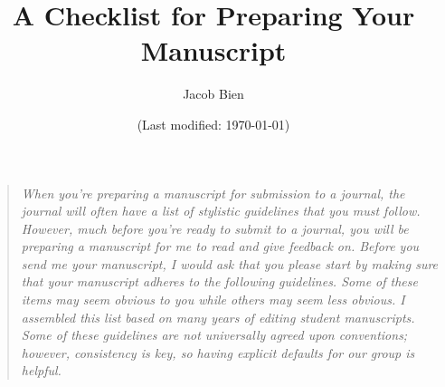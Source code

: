 \documentclass[11pt]{article}
\title{A Checklist for Preparing Your Manuscript}
\author{Jacob Bien}
\date{(Last modified: \today)}
\begin{document}
\maketitle

\begin{quote}
{\em When you're preparing a manuscript for submission to a journal,
  the journal will often have a list of stylistic guidelines that you
  must follow.  However, much before you're ready to submit to a
  journal, you will be preparing a manuscript for me to read and give
  feedback on.  Before you send me your manuscript, I would ask that
  you please start by making sure that your manuscript adheres to the
  following guidelines.  Some of these items may seem obvious to you
  while others may seem less obvious.  I assembled this list based on
  many years of editing student manuscripts.  Some of these guidelines
are not universally agreed upon conventions; however, consistency is
key, so having explicit defaults for our group is helpful.}
\end{quote}
\end{document}
